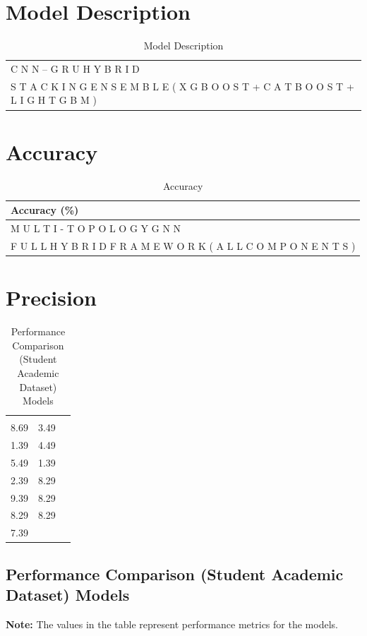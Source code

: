 \documentclass[twocolumn]{svjour3}
\begin{document}
\section{Model Description}
\begin{table}
\centering
\caption{Model Description}
\begin{tabular}{l}
\hline
C N N – G R U H Y B R I D \\
S T A C K I N G E N S E M B L E ( X G B O O S T + C A T B O O S T + L I G H T G B M ) \\
\hline
\end{tabular}
\end{table}
\section{Accuracy}
\begin{table}
\centering
\caption{Accuracy}
\begin{tabular}{l}
\hline
Accuracy (\%) \\
\hline
M U L T I - T O P O L O G Y G N N \\
F U L L H Y B R I D F R A M E W O R K ( A L L C O M P O N E N T S ) \\
\hline
\end{tabular}
\end{table}

\section{Precision}
\begin{table}
\centering
\caption{Performance Comparison (Student Academic Dataset) Models}
\begin{tabular}{lll}
\hline
 & & \\
8.69 & 3.49 & \\
1.39 & 4.49 & \\
5.49 & 1.39 & \\
2.39 & 8.29 & \\
9.39 & 8.29 & \\
8.29 & 8.29 & \\
7.39 & & \\
\hline
\end{tabular}
\end{table}
\subsection{Performance Comparison (Student Academic Dataset) Models}
\textbf{Note:} The values in the table represent performance metrics for the models.
\end{document}
